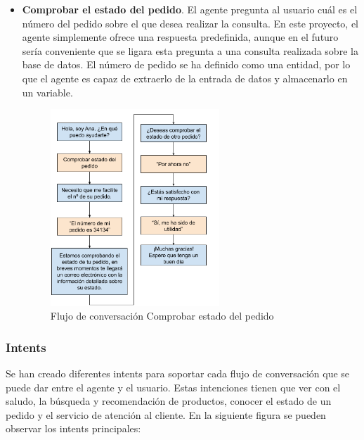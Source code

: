 \begin{itemize}
    \item \textbf{Comprobar el estado del pedido}. El agente pregunta al usuario cuál es el número del pedido sobre el que desea realizar la consulta. En este proyecto, el agente simplemente ofrece una respuesta predefinida, aunque en el futuro sería conveniente que se ligara esta pregunta a una consulta realizada sobre la base de datos. El número de pedido se ha definido como una entidad, por lo que el agente es capaz de extraerlo de la entrada de datos y almacenarlo en un variable.
    \begin{figure}[ht]
    	\begin{center}
    		\includegraphics[width = 0.60\textwidth]{Figuras/Comprobar estado del pedido.png}
    	\end{center}
	\caption{\label{fig:estadoPedido} Flujo de conversación Comprobar estado del pedido}
    \end{figure}
\newpage

\end{itemize}

\subsubsection{Intents}

Se han creado diferentes intents para soportar cada flujo de conversación que se puede dar entre el agente y el usuario. Estas intenciones tienen que ver con el saludo, la búsqueda y recomendación de productos, conocer el estado de un pedido y el servicio de atención al cliente. En la siguiente figura se pueden observar los intents principales:


